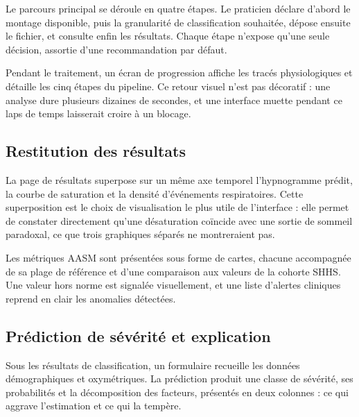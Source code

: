 Le parcours principal se déroule en quatre étapes. Le praticien déclare d'abord le
montage disponible, puis la granularité de classification souhaitée, dépose ensuite le
fichier, et consulte enfin les résultats. Chaque étape n'expose qu'une seule décision,
assortie d'une recommandation par défaut.



Pendant le traitement, un écran de progression affiche les tracés physiologiques et
détaille les cinq étapes du pipeline. Ce retour visuel n'est pas décoratif : une
analyse dure plusieurs dizaines de secondes, et une interface muette pendant ce laps
de temps laisserait croire à un blocage.


\subsection{Restitution des résultats}

La page de résultats superpose sur un même axe temporel l'hypnogramme prédit, la courbe
de saturation et la densité d'événements respiratoires. Cette superposition est le
choix de visualisation le plus utile de l'interface : elle permet de constater
directement qu'une désaturation coïncide avec une sortie de sommeil paradoxal, ce que
trois graphiques séparés ne montreraient pas.


Les métriques AASM sont présentées sous forme de cartes, chacune accompagnée de sa
plage de référence et d'une comparaison aux valeurs de la cohorte SHHS. Une valeur hors
norme est signalée visuellement, et une liste d'alertes cliniques reprend en clair les
anomalies détectées.

\subsection{Prédiction de sévérité et explication}

Sous les résultats de classification, un formulaire recueille les données
démographiques et oxymétriques. La prédiction produit une classe de sévérité, ses
probabilités et la décomposition des facteurs, présentés en deux colonnes : ce qui
aggrave l'estimation et ce qui la tempère.

